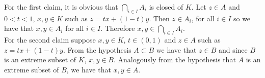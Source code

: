 \documentclass[12pt]{article}
\begin{document}
For the first claim, it is obvious that $\bigcap_{i\in I}A_i$ is closed  of $K$. Let $z \in A$ and $0<t<1$, $x, y\in  K$ such as 
$z=tx+(1-t)y$. Then $z \in A_i$, for all $i\in I$ so we have that $x,y \in A_i$ for all $i\in I$. Therefore $x,y \in \bigcap_{i\in I}A_i.$
\\For the second claim suppose $x,y \in K$, $t\in(0,1)$ and  $z\in A$ such as $z=tx+(1-t)y$. From the hypothesis $A\subset B$ we have that 
$z\in B$ and since $B$ is an extreme subset of $K$, $x,y \in  B$. Analogously from the hypothesis that $A$ is an extreme subset of $B$, we have that $x,y \in A$.
\end{document}
